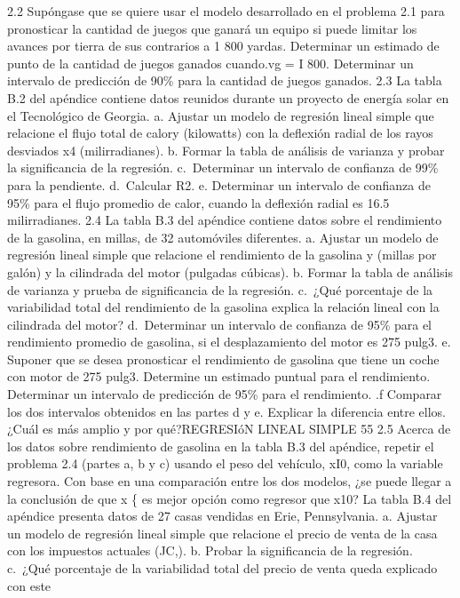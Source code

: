 \documentclass[
]{article}
\begin{document}
2.2 Supóngase que se quiere usar el modelo desarrollado en el problema
2.1 para pronosticar la cantidad de juegos que ganará un equipo si puede
limitar los avances por tierra de sus contrarios a 1 800 yardas.
Determinar un estimado de punto de la cantidad de juegos ganados
cuando.vg = I 800. Determinar un intervalo de predicción de 90\% para la
cantidad de juegos ganados. 2.3 La tabla B.2 del apéndice contiene datos
reunidos durante un proyecto de energía solar en el Tecnológico de
Georgia. a. Ajustar un modelo de regresión lineal simple que relacione
el flujo total de calory (kilowatts) con la deflexión radial de los
rayos desviados x4 (milirradianes). b. Formar la tabla de análisis de
varianza y probar la significancia de la regresión. c.~Determinar un
intervalo de confianza de 99\% para la pendiente. d.~Calcular R2. e.
Determinar un intervalo de confianza de 95\% para el flujo promedio de
calor, cuando la deflexión radial es 16.5 milirradianes. 2.4 La tabla
B.3 del apéndice contiene datos sobre el rendimiento de la gasolina, en
millas, de 32 automóviles diferentes. a. Ajustar un modelo de regresión
lineal simple que relacione el rendimiento de la gasolina y (millas por
galón) y la cilindrada del motor (pulgadas cúbicas). b. Formar la tabla
de análisis de varianza y prueba de significancia de la regresión.
c.~¿Qué porcentaje de la variabilidad total del rendimiento de la
gasolina explica la relación lineal con la cilindrada del motor?
d.~Determinar un intervalo de confianza de 95\% para el rendimiento
promedio de gasolina, si el desplazamiento del motor es 275 pulg3. e.
Suponer que se desea pronosticar el rendimiento de gasolina que tiene un
coche con motor de 275 pulg3. Determine un estimado puntual para el
rendimiento. Determinar un intervalo de predicción de 95\% para el
rendimiento. .f Comparar los dos intervalos obtenidos en las partes d y
e. Explicar la diferencia entre ellos. ¿Cuál es más amplio y por
qué?REGRESIóN LINEAL SIMPLE 55 2.5 Acerca de los datos sobre rendimiento
de gasolina en la tabla B.3 del apéndice, repetir el problema 2.4
(partes a, b y c) usando el peso del vehículo, xI0, como la variable
regresora. Con base en una comparación entre los dos modelos, ¿se puede
llegar a la conclusión de que x \{ es mejor opción como regresor que
x10? La tabla B.4 del apéndice presenta datos de 27 casas vendidas en
Erie, Pennsylvania. a. Ajustar un modelo de regresión lineal simple que
relacione el precio de venta de la casa con los impuestos actuales
(JC,). b. Probar la significancia de la regresión. c.~¿Qué porcentaje de
la variabilidad total del precio de venta queda explicado con este
\end{document}
